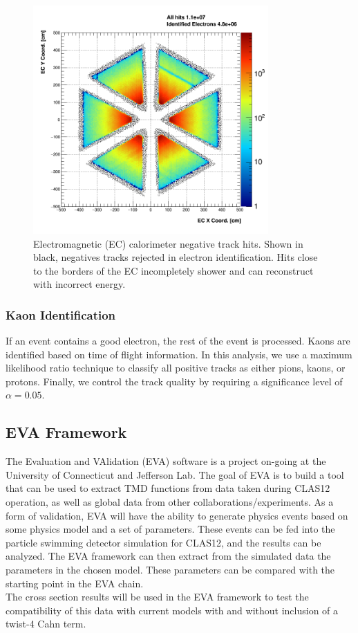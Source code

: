 \begin{figure}
  \centering
  \includegraphics[width=9cm]{image/ECFiducial.png}
  \caption{Electromagnetic (EC) calorimeter negative track hits.  Shown in black, negatives tracks rejected in electron identification.  Hits close to the borders of the EC incompletely shower and can reconstruct with incorrect energy.}
  \label{fig:ecfid}
\end{figure}

\subsubsection{Kaon Identification}
If an event contains a good electron, the rest of the event is processed.  Kaons are identified based on time of flight information.  In this analysis, we use a maximum likelihood ratio technique to classify all positive tracks as either pions, kaons, or protons.  Finally, we control the track quality by requiring a significance level of $\alpha = 0.05$.  

\subsection{EVA Framework}
The Evaluation and VAlidation (EVA) software is a project on-going at the University of Connecticut and Jefferson Lab.  The goal of EVA is to build a tool that can be used to extract TMD functions from data taken during CLAS12 operation, as well as global data from other collaborations/experiments.  As a form of validation, EVA will have the ability to generate physics events based on some physics model and a set of parameters.  These events can be fed into the particle swimming detector simulation for CLAS12, and the results can be analyzed.  The EVA framework can then extract from the simulated data the parameters in the chosen model.  These parameters can be compared with the starting point in the EVA chain. \\

The cross section results will be used in the EVA framework to test the compatibility of this data with current models with and without inclusion of a twist-4 Cahn term.
